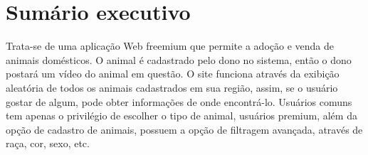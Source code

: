  
\chapter{Sumário executivo}

	Trata-se de uma aplicação Web freemium que permite a adoção e venda de animais domésticos. O animal é cadastrado pelo dono no sistema, então o dono postará um vídeo do animal em questão. O site funciona através da exibição aleatória de todos os animais cadastrados em sua região, assim, se o usuário gostar de algum, pode obter informações de onde encontrá-lo. Usuários comuns tem apenas o privilégio de escolher o tipo de animal, usuários premium, além da opção de cadastro de animais, possuem a opção de filtragem avançada, através de raça, cor, sexo, etc.

	
